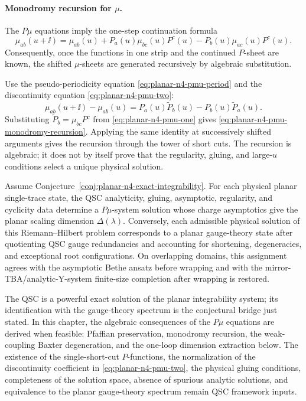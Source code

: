 \paragraph{Monodromy recursion for \(\mu\).}
The \(P\mu\) equations imply the one-step continuation formula
\begin{equation}
  \mu_{ab}(u+\ii)
  =
  \mu_{ab}(u)
  +P_a(u)\mu_{bc}(u)P^c(u)
  -P_b(u)\mu_{ac}(u)P^c(u).
  \label{eq:planar-n4-pmu-monodromy-recursion}
\end{equation}
Consequently, once the functions in one strip and the continued \(P\)-sheet
are known, the shifted \(\mu\)-sheets are generated recursively by algebraic
substitution.

Use the pseudo-periodicity equation
\eqref{eq:planar-n4-pmu-period} and the discontinuity equation
\eqref{eq:planar-n4-pmu-two}:
\[
  \mu_{ab}(u+\ii)-\mu_{ab}(u)
  =
  P_a(u)\widetilde P_b(u)-P_b(u)\widetilde P_a(u).
\]
Substituting \(\widetilde P_b=\mu_{bc}P^c\) from
\eqref{eq:planar-n4-pmu-one} gives
\eqref{eq:planar-n4-pmu-monodromy-recursion}.  Applying the same identity at
successively shifted arguments gives the recursion through the tower of
short cuts.  The recursion is algebraic; it does not by itself prove that the
regularity, gluing, and large-\(u\) conditions select a unique physical
solution.

\begin{conjecture}
\label{conj:planar-n4-qsc-spectrum-bridge}
Assume Conjecture~\ref{conj:planar-n4-exact-integrability}.  For each physical
planar single-trace state, the QSC analyticity, gluing, asymptotic, regularity,
and cyclicity data determine a \(P\mu\)-system solution whose charge
asymptotics give the planar scaling dimension \(\Delta(\lambda)\).  Conversely,
each admissible physical solution of this Riemann--Hilbert problem corresponds
to a planar gauge-theory state after quotienting QSC gauge redundancies and
accounting for shortening, degeneracies, and exceptional root configurations.
On overlapping domains, this assignment agrees with the asymptotic Bethe
ansatz before wrapping and with the mirror-TBA/analytic-Y-system finite-size
completion after wrapping is restored.
\end{conjecture}

The QSC is a powerful exact solution of the planar integrability system; its
identification with the gauge-theory spectrum is the conjectural bridge just
stated.  In this chapter, the algebraic consequences of the \(P\mu\) equations
are derived when feasible: Pfaffian preservation, monodromy recursion, the
weak-coupling Baxter degeneration, and the one-loop dimension extraction
below.  The existence of the single-short-cut \(P\)-functions, the
normalization of the discontinuity coefficient in
\eqref{eq:planar-n4-pmu-two}, the physical gluing conditions, completeness of
the solution space, absence of spurious analytic solutions, and equivalence to
the planar gauge-theory spectrum remain QSC framework inputs.

